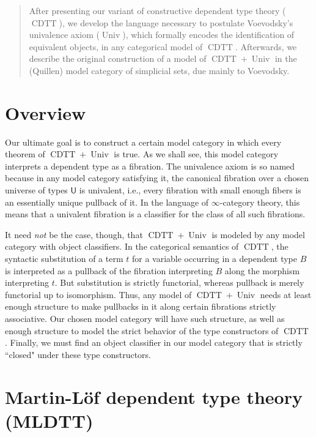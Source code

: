 \documentclass[10pt,letterpaper,cm]{nupset}
\theoremstyle{definition}
\theoremstyle{theorem}
\theoremstyle{remark}
\newcommand{\U}{\mathsf{U}}
\newcommand{\0}{\mathbf{0}}
\newcommand{\1}{\mathbf{1}}
\newcommand{\2}{\mathbf{2}}
\DeclareMathOperator{\cdtt}{\mathrm{CDTT}}
\DeclareMathOperator{\univ}{\mathrm{Univ}}
\begin{document}
\begin{abstract}
 After presenting our variant of constructive dependent type theory ($\cdtt$), we develop the language necessary to postulate Voevodsky's univalence axiom ($\univ$), which formally encodes the identification of equivalent objects, in any categorical model of $\cdtt$. Afterwards, we describe the original construction of a model of $\cdtt+\univ$ in the (Quillen)  model category of simplicial sets, due mainly to Voevodsky.
\end{abstract}

\tableofcontents

\section*{Overview}

Our ultimate goal is to construct a certain  model category  in which every theorem of $\cdtt +\univ$ is true.
As we shall see, this model category interprets a dependent type as a fibration. The univalence axiom is so named because in any model category satisfying it, the canonical fibration over a chosen universe of types $\U$ is univalent, i.e.,  every fibration with small enough fibers is an essentially unique pullback of it. In the language of $\infty$-category theory, this means that a univalent fibration is a classifier for the class of all such fibrations.

\medskip

It need \emph{not} be the case, though, that $\cdtt+\univ$ is modeled by any model category with object classifiers. In the categorical semantics of $\cdtt$, the syntactic substitution of a term $t$ for a variable occurring in a dependent type $B$ is interpreted as a pullback of the fibration interpreting $B$ along the morphism interpreting $t$. But substitution is strictly functorial, whereas pullback is merely functorial up to isomorphism. Thus, any model of $\cdtt+\univ$ needs at least enough structure to make pullbacks in it along certain fibrations strictly associative. Our chosen  model category will have such structure, as well as enough structure to model the strict behavior of the type constructors of $\cdtt$. Finally, we must find an object classifier in our model category that is strictly ``closed" under these type constructors. 

\section{Martin-L\"of  dependent  type theory (MLDTT)}
\end{document}
